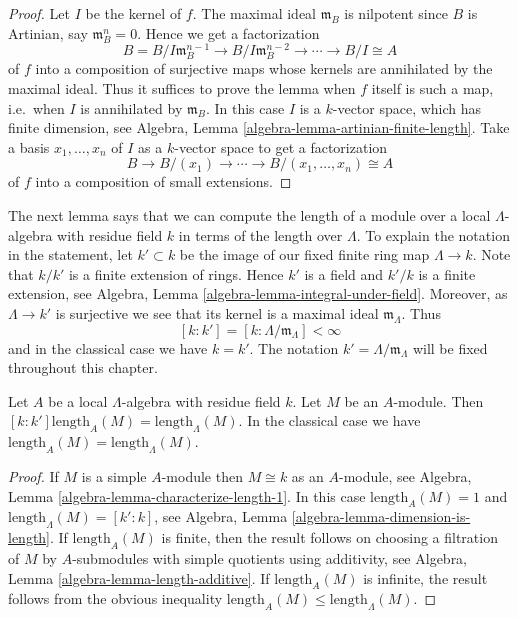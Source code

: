 \begin{proof}
Let $I$ be the kernel of $f$.  The maximal ideal $\mathfrak{m}_{B}$ is 
nilpotent since $B$ is Artinian, say $\mathfrak{m}_{B}^n = 0$. Hence we get a 
factorization
\[ B = B/I\mathfrak{m}_B^{n-1} \to B/I\mathfrak{m}_B^{n-2} \to 
\cdots \to B/I \cong A \]
of $f$ into a composition of surjective maps whose kernels are annihilated by 
the maximal ideal.  Thus it suffices to prove the lemma when $f$ itself is such 
a map, i.e.\ when $I$ is annihilated by $\mathfrak{m}_B$. In this case
$I$ is a $k$-vector space, which has finite dimension, see
Algebra, Lemma \ref{algebra-lemma-artinian-finite-length}.
Take a basis $x_1, \dots, x_n$ of $I$ as a $k$-vector space to get a
factorization
$$
B \to B/(x_1) \to \cdots \to  B/(x_1, \dots, x_n) \cong  A
$$
of $f$ into a composition of small extensions.
\end{proof}

\noindent
The next lemma says that we can compute the length of a module over a local 
$\Lambda$-algebra with residue field $k$ in terms of the length over
$\Lambda$. To explain the notation in the statement, let $k' \subset k$
be the image of our fixed finite ring map $\Lambda \to k$. Note
that $k/k'$ is a finite extension of rings. Hence $k'$ is a field
and $k'/k$ is a finite extension, see
Algebra, Lemma \ref{algebra-lemma-integral-under-field}.
Moreover, as $\Lambda \to k'$ is surjective we see that its kernel
is a maximal ideal $\mathfrak m_\Lambda$. Thus
\begin{equation}
\label{equation-k-prime}
[k : k'] = [k : \Lambda/\mathfrak m_\Lambda] < \infty
\end{equation}
and in the classical case we have $k = k'$. The notation
$k' = \Lambda/\mathfrak m_\Lambda$ will be fixed throughout this chapter.

\begin{lemma}
\label{lemma-length}
Let $A$ be a local $\Lambda$-algebra with residue field $k$.
Let $M$ be an $A$-module. Then
$[k : k'] \text{length}_{A}(M) = \text{length}_\Lambda(M)$.
In the classical case we have
$\text{length}_{A}(M) = \text{length}_\Lambda(M)$.
\end{lemma}

\begin{proof}
If $M$ is a simple $A$-module then $M \cong k$ as an $A$-module, see
Algebra, Lemma \ref{algebra-lemma-characterize-length-1}.
In this case $\text{length}_A(M) = 1$ and
$\text{length}_\Lambda(M) = [k' : k]$, see
Algebra, Lemma \ref{algebra-lemma-dimension-is-length}.
If $\text{length}_A(M)$ is finite, then the result follows on
choosing a filtration of $M$ by $A$-submodules with simple quotients
using additivity, see
Algebra, Lemma \ref{algebra-lemma-length-additive}.
If $\text{length}_A(M)$ is infinite, the result follows from the obvious 
inequality $\text{length}_A(M) \leq \text{length}_\Lambda(M)$.
\end{proof}

